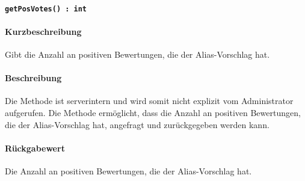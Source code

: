 \paragraph{\texttt{getPosVotes() : int}}%
\paragraph*{Kurzbeschreibung}
Gibt die Anzahl an positiven Bewertungen, die der Alias-Vorschlag hat.
\paragraph*{Beschreibung}
Die Methode ist serverintern und wird somit nicht explizit vom Administrator aufgerufen.
Die Methode ermöglicht, dass die Anzahl an positiven Bewertungen, die der Alias-Vorschlag hat, angefragt und zurückgegeben werden kann.
\paragraph*{Rückgabewert}
Die Anzahl an positiven Bewertungen, die der Alias-Vorschlag hat.
